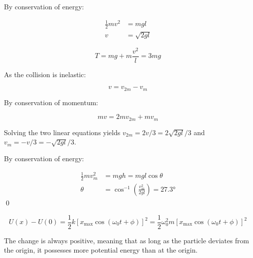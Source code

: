 \documentclass[12pt]{article}
\begin{document}

By conservation of energy:

\begin{equation}
\begin{split}
    \frac{1}{2} m v^{2} &= mgl \\
    v &= \sqrt{2gl}
\end{split}
\end{equation}


\begin{equation}
    T = mg + m \frac{v^{2}}{l} = 3mg
\end{equation}

As the collision is inelastic:

\begin{equation}
    v = v_{2m} - v_{m}
\end{equation}

By conservation of momentum:

\begin{equation}
    mv = 2m v_{2m} + m v_{m}
\end{equation}

Solving the two linear equations yields $v_{2m} = 2v/3 = 2\sqrt{2gl}/3$ and $v_{m} = -v/3 = -\sqrt{2gl}/3$.

By conservation of energy:

\begin{equation}
\begin{split}
    \frac{1}{2} m v_{m}^{2} &= mgh = mgl \cos{\theta} \\
    \theta &= \cos^{-1}{\left( \frac{v_{m}^{2}}{2gl} \right)} = \ang{27.3} 
\end{split}
\end{equation}
\qed




\begin{equation}
    U(x) - U(0) = \frac{1}{2} k \left[ x_{\text{max}} \cos{(\omega_{0}t + \phi)} \right]^{2} = \frac{1}{2} \omega_{0}^{2} m \left[ x_{\text{max}} \cos{(\omega_{0}t + \phi)} \right]^{2}
\end{equation}

The change is always positive, meaning that as long as the particle deviates from the origin, it possesses more potential energy than at the origin.
\end{document}

